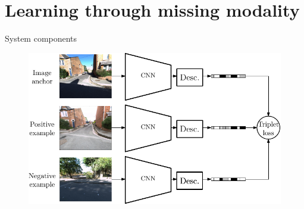 \section{Learning through missing modality}

\label{sec:method}

\begin{frame}{System components}
	\begin{minipage}[t]{0.50\linewidth}
		{
		\begin{figure}
		\centering
		\includegraphics[width=\linewidth]{vect/method/fig2/3n}
		\end{figure}	
		}
	\end{minipage}\hfill
\end{frame}
